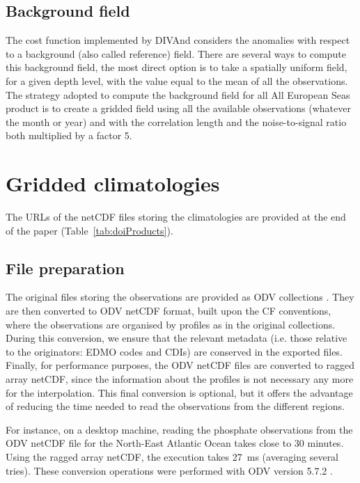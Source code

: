 \documentclass[essd, manuscript]{copernicus}
\begin{document}
\subsection{Background field}

The cost function implemented by DIVAnd considers the anomalies with respect to a background (also called reference) field. There are several ways to compute this background field, the most direct option is to take a spatially uniform field, for a given depth level, with the value equal to the mean of all the observations. The strategy adopted to compute the background field for all All European Seas product is to create a gridded field using all the available observations (whatever the month or year) and with the correlation length and the noise-to-signal ratio both multiplied by a factor 5. 

\section{Gridded climatologies\label{sec:clim}}

The URLs of the netCDF files storing the climatologies are provided at the end of the paper (Table~\ref{tab:doiProducts}).

\subsection{File preparation}

The original files storing the observations are provided as ODV collections \citep[Ocean Data View,][]{SCHLITZER2002}. They are then converted to ODV netCDF format, built upon the CF conventions, where the observations are organised by profiles as in the original collections. During this conversion, we ensure that the relevant metadata (i.e. those relative to the originators: EDMO codes and CDIs) are conserved in the exported files. Finally, for performance purposes, the ODV netCDF files are converted to ragged array netCDF, since the information about the profiles is not necessary any more for the interpolation. This final conversion is optional, but it offers the advantage of reducing the time needed to read the observations from the different regions.

For instance, on a desktop machine, reading the phosphate observations from the ODV netCDF file for the North-East Atlantic Ocean takes close to 30 minutes. Using the ragged array netCDF, the execution takes 27~ms (averaging several tries). These conversion operations were performed with ODV version 5.7.2 \citep{Schlitzer2024}.
\end{document}
